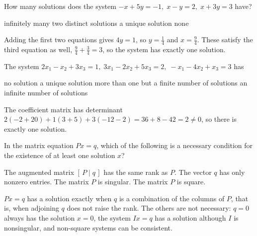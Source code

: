 \begin{question}[id=gate-cs2004-1, source=GATE CS 2004]
How many solutions does the system $-x + 5y = -1,\; x - y = 2,\; x + 3y = 3$ have?
\begin{options}
  \option infinitely many
  \option two distinct solutions
  \correct a unique solution
  \option none
\end{options}
\begin{solution}
Adding the first two equations gives $4y = 1$, so $y = \frac{1}{4}$ and $x = \frac{9}{4}$. These satisfy the third equation as well, $\frac{9}{4} + \frac{3}{4} = 3$, so the system has exactly one solution.
\end{solution}
\end{question}

\begin{question}[id=gate-cs2005-1, source=GATE CS 2005]
The system $2x_1 - x_2 + 3x_3 = 1,\; 3x_1 - 2x_2 + 5x_3 = 2,\; -x_1 - 4x_2 + x_3 = 3$ has
\begin{options}
  \option no solution
  \correct a unique solution
  \option more than one but a finite number of solutions
  \option an infinite number of solutions
\end{options}
\begin{solution}
The coefficient matrix has determinant $2(-2 + 20) + 1(3 + 5) + 3(-12 - 2) = 36 + 8 - 42 = 2 \ne 0$, so there is exactly one solution.
\end{solution}
\end{question}

\begin{question}[id=gate-ee2005-1, source=GATE EE 2005]
In the matrix equation $Px = q$, which of the following is a necessary condition for the existence of at least one solution $x$?
\begin{options}
  \correct The augmented matrix $[\,P \mid q\,]$ has the same rank as $P$.
  \option The vector $q$ has only nonzero entries.
  \option The matrix $P$ is singular.
  \option The matrix $P$ is square.
\end{options}
\begin{solution}
$Px = q$ has a solution exactly when $q$ is a combination of the columns of $P$, that is, when adjoining $q$ does not raise the rank. The others are not necessary: $q = 0$ always has the solution $x = 0$, the system $Ix = q$ has a solution although $I$ is nonsingular, and non-square systems can be consistent.
\end{solution}
\end{question}

